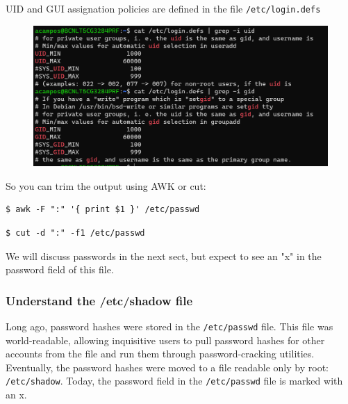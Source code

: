 \documentclass{article}
\newenvironment{blocktemplate}[1]{%
    \tcolorbox[beamer,%
    noparskip,breakable,
    colframe=Blue,%
    colbacklower=LimeGreen!75!LightGreen,%
    title=#1]}%
    {\endtcolorbox}
\newenvironment{blocktemplateI}[1]{%
    \tcolorbox[beamer,%
    noparskip,breakable,
    colframe=Violet,%
    colbacklower=Black,%
    title=#1]}%
    {\endtcolorbox}
\newenvironment{codetemplate}[1][]{%
  \mybasecolorbox[#1]
  \itshape
}{%
  \endmybasecolorbox
}
\begin{document}
\begin{blocktemplateI}{NOTE}
UID and GUI assignation policies are defined in the file \verb|/etc/login.defs|
\begin{figure}[H]
    \includegraphics[scale=0.7]{pictures/defsbig.png}
    \centering
\end{figure}
\end{blocktemplateI}



So you can trim the output using AWK or cut:
\begin{codetemplate}{}
\begin{verbatim}
$ awk -F ":" '{ print $1 }' /etc/passwd
\end{verbatim}
\end{codetemplate}
\begin{codetemplate}{}
\begin{verbatim}
$ cut -d ":" -f1 /etc/passwd
\end{verbatim}
\end{codetemplate}

\begin{blocktemplate}{NOTE}
We will discuss passwords in the next sect, but expect to see an "x" in the password field of this file.
\end{blocktemplate}

\subsubsection{Understand the /etc/shadow file}
Long ago, password hashes were stored in the \verb|/etc/passwd| file. This file was world-readable, allowing inquisitive users to pull password hashes for other accounts from the file and run them through password-cracking utilities. Eventually, the password hashes were moved to a file readable only by root: \verb|/etc/shadow|. Today, the password field in the \verb|/etc/passwd| file is marked with an x.
\end{document}
